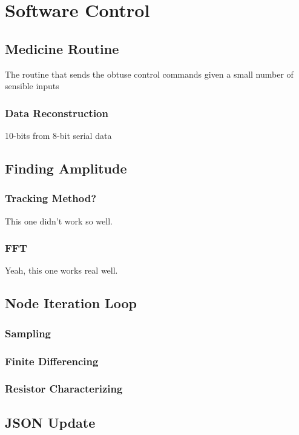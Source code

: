 \chapter{Software Control}

\section{Medicine Routine}
The routine that sends the obtuse control commands given a small number of sensible inputs
\subsection{Data Reconstruction}
10-bits from 8-bit serial data

\section{Finding Amplitude}
\subsection{Tracking Method?}
This one didn't work so well.
\subsection{FFT}
Yeah, this one works real well.

\section{Node Iteration Loop}
\subsection{Sampling}
\subsection{Finite Differencing}
\subsection{Resistor Characterizing}

\section{JSON Update}


